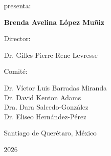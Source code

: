 \documentclass[12pt,letterpaper,oneside]{book}
\begin{document}
\begin{titlepage}
\begin{minipage}[c][0.75\textheight][t]{0.70\textwidth}
\begin{center}
        {\large
        presenta:
        }

        \vspace{0.35cm}

        {\large
        \textbf{Brenda Avelina López Muñiz}
        }

        \vspace{1.5cm}


        {\large
        Director:
        }

        \vspace{0.25cm}

        {\large
        Dr. Gilles Pierre Rene Levresse
        }

        \vspace{0.7cm}


        {\large
        Comité:
        }

        \vspace{1.5cm}

        \normalsize
        Dr. Víctor Luis Barradas Miranda\\
        Dr. David Kenton Adams\\
        Dra. Dara Salcedo-González\\ 
        Dr. Eliseo Hernández-Pérez


        \vfill


        {\large
        Santiago de Querétaro, México
        }

        \vspace{0.2cm}

        {\large
        2026
        }

    \end{center}

\end{minipage}

\end{titlepage}


\end{document}
